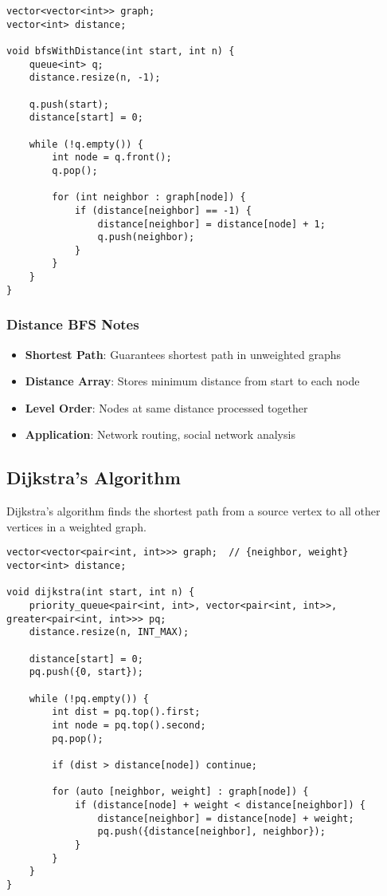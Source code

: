 \documentclass[11pt,a4paper]{article}
\begin{document}
\newpage
\begin{lstlisting}[caption={BFS with Distance Calculation}]
vector<vector<int>> graph;
vector<int> distance;

void bfsWithDistance(int start, int n) {
    queue<int> q;
    distance.resize(n, -1);
    
    q.push(start);
    distance[start] = 0;
    
    while (!q.empty()) {
        int node = q.front();
        q.pop();
        
        for (int neighbor : graph[node]) {
            if (distance[neighbor] == -1) {
                distance[neighbor] = distance[node] + 1;
                q.push(neighbor);
            }
        }
    }
}
\end{lstlisting}

\subsubsection{Distance BFS Notes}
\begin{itemize}
\item \textbf{Shortest Path}: Guarantees shortest path in unweighted graphs
\item \textbf{Distance Array}: Stores minimum distance from start to each node
\item \textbf{Level Order}: Nodes at same distance processed together
\item \textbf{Application}: Network routing, social network analysis
\end{itemize}

\newpage
\subsection{Dijkstra's Algorithm}
Dijkstra's algorithm finds the shortest path from a source vertex to all other vertices in a weighted graph.

\begin{lstlisting}[caption={Dijkstra's Algorithm}]
vector<vector<pair<int, int>>> graph;  // {neighbor, weight}
vector<int> distance;

void dijkstra(int start, int n) {
    priority_queue<pair<int, int>, vector<pair<int, int>>, greater<pair<int, int>>> pq;
    distance.resize(n, INT_MAX);
    
    distance[start] = 0;
    pq.push({0, start});
    
    while (!pq.empty()) {
        int dist = pq.top().first;
        int node = pq.top().second;
        pq.pop();
        
        if (dist > distance[node]) continue;
        
        for (auto [neighbor, weight] : graph[node]) {
            if (distance[node] + weight < distance[neighbor]) {
                distance[neighbor] = distance[node] + weight;
                pq.push({distance[neighbor], neighbor});
            }
        }
    }
}
\end{lstlisting}
\end{document}
